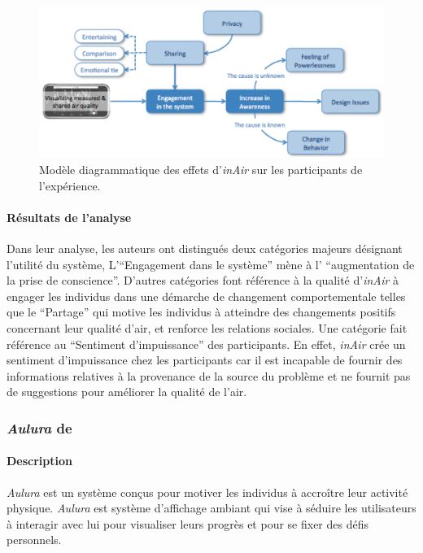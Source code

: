 \documentclass[10pt,a5paper,twoside]{article}
\begin{document}
\begin{figure}
\centering
\includegraphics[]{images/inair-diagram.png}
\caption{Modèle diagrammatique des effets d'\emph{inAir} sur les
participants de l'expérience.}\label{fig:inair4}
\end{figure}

\paragraph{Résultats de l'analyse}\label{ruxe9sultats-de-lanalyse}

Dans leur analyse, les auteurs ont distingués deux catégories majeurs
désignant l'utilité du système, L'``Engagement dans le système'' mène à
l' ``augmentation de la prise de conscience''. D'autres catégories font
référence à la qualité d'\emph{inAir} à engager les individus dans une
démarche de changement comportementale telles que le ``Partage'' qui
motive les individus à atteindre des changements positifs concernant
leur qualité d'air, et renforce les relations sociales. Une catégorie
fait référence au ``Sentiment d'impuissance'' des participants. En
effet, \emph{inAir} crée un sentiment d'impuissance chez les
participants car il est incapable de fournir des informations relatives
à la provenance de la source du problème et ne fournit pas de
suggestions pour améliorer la qualité de l'air.

\subsubsection{\emph{Aulura} de
\citet{faber2011aulura}}\label{aulura-de-faber2011aulura}

\paragraph{Description}\label{description-3}

\emph{Aulura} est un système conçus pour motiver les individus à
accroître leur activité physique. \emph{Aulura} est système d'affichage
ambiant qui vise à séduire les utilisateurs à interagir avec lui pour
visualiser leurs progrès et pour se fixer des défis personnels.
\end{document}
